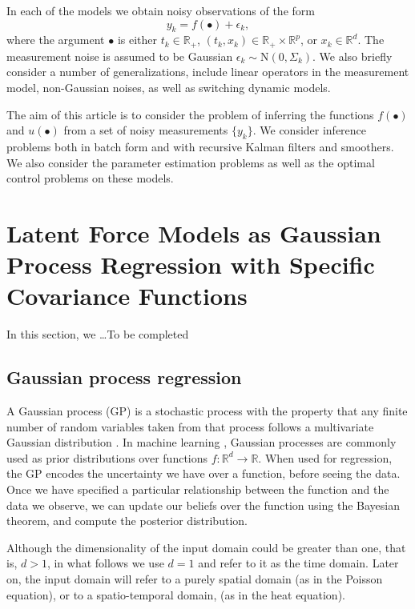 \documentclass[journal]{IEEEtran}
\newcommand{\simo}[1]{{\color{red}#1}}
\begin{document}
In each of the models we obtain noisy observations of the form
%
\begin{equation}
  y_k = f(\bullet) + \epsilon_k,
\end{equation}
%
where the argument $\bullet$ is either $t_k \in \mathbb{R}_+$, $(t_k,x_k) \in \mathbb{R}_+ \times \mathbb{R}^p$, or $x_k \in \mathbb{R}^d$. The measurement noise is assumed to be Gaussian $\epsilon_k \sim \mathrm{N}(0,\Sigma_k)$. We also briefly consider a number of generalizations, include linear operators in the measurement model, non-Gaussian noises, as well as switching dynamic models.

The aim of this article is to consider the problem of inferring the functions $f(\bullet)$ and $u(\bullet)$ from a set of noisy measurements $\{ y_k \}$. We consider inference problems both in batch form and with recursive Kalman filters and smoothers. We also consider the parameter estimation problems as well as the optimal control problems on these models.

\section{Latent Force Models as Gaussian Process Regression with Specific Covariance Functions}

In this section, we \ldots \simo{To be completed}


\subsection{Gaussian process regression}\label{sec:gp:regression}
%

A Gaussian process (GP) is a stochastic process with the property that any finite number of random variables taken from that process follows a multivariate Gaussian distribution \cite{Rasmussen+Williams:2006, Shanmugan:randomSignals:88}. In machine learning \cite{Rasmussen+Williams:2006}, Gaussian processes are commonly used as prior distributions over functions $f: \mathbb{R}^d\rightarrow \mathbb{R}$. When used for regression, the GP encodes the uncertainty we have over a function, before seeing the data. Once we have specified a particular relationship between the function and the data we observe, we can update our beliefs over the function using the Bayesian theorem, and compute the posterior distribution. 

Although the dimensionality of the input domain could be greater than one, that is, $d>1$, in what follows we use $d=1$ and refer to it as the time domain. Later on, the input domain will refer to a purely spatial domain (as in the Poisson equation), or to a spatio-temporal domain, (as in the heat equation). 
\end{document}
